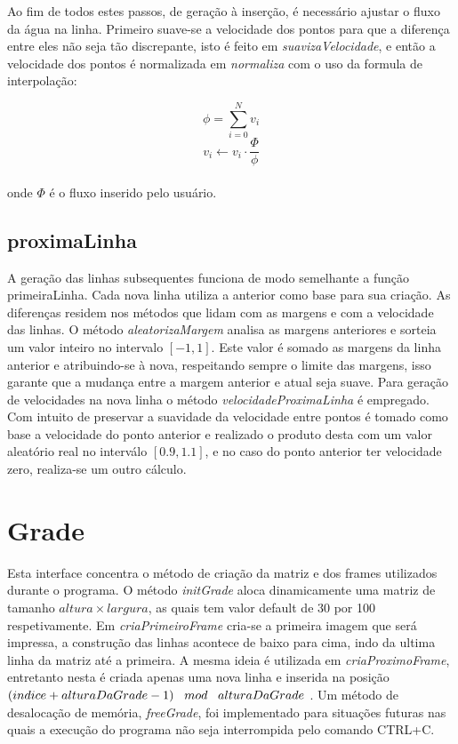 \documentclass[a4paper,11pt]{article}
\begin{document}
Ao fim de todos estes passos, de gera\c{c}ão à inser\c{c}ão, é necessário ajustar o fluxo da água na linha. Primeiro suave-se a velocidade dos pontos	 para que a diferen\c{c}a entre eles não seja tão discrepante, isto é feito em \textit{suavizaVelocidade}, e então a velocidade dos pontos é normalizada em \textit{normaliza} com o uso da formula de interpola\c{c}ão: 

\begin{equation}
\phi = \sum_{i=0}^{N} v_i
\end{equation}
\begin{equation}
v_i \leftarrow v_i\cdot\dfrac{\Phi}{\phi}
\end{equation}
\\
onde $\Phi$ é o fluxo inserido pelo usuário.

\subsection{proximaLinha}

A gera\c{c}ão das linhas subsequentes funciona de modo semelhante a fun\c{c}ão primeiraLinha. Cada nova linha utiliza a anterior como base para sua cria\c{c}ão. As diferen\c{c}as residem nos métodos que lidam com as margens e com a velocidade das linhas. O método \textit{aleatorizaMargem} analisa as margens anteriores e sorteia um valor inteiro no intervalo $[-1,1]$. Este valor é somado as margens da linha anterior e atribuindo-se à nova, respeitando sempre o limite das margens, isso garante que a mudan\c{c}a entre a margem anterior e atual seja suave. Para gera\c{c}ão de velocidades na nova linha o método \textit{velocidadeProximaLinha} é empregado. Com intuito de preservar a suavidade da velocidade entre pontos é tomado como base a velocidade do ponto anterior e realizado o produto desta com um valor aleatório real no interválo $[0.9,1.1]$, e no caso do ponto anterior ter velocidade zero, realiza-se um outro cálculo.

\section{Grade}
Esta interface concentra o método de cria\c{c}ão da matriz e dos frames utilizados durante o programa. O método \textit{initGrade} aloca dinamicamente uma matriz de tamanho $altura \times largura$, as quais tem valor default de 30 por 100 respetivamente. Em \textit{criaPrimeiroFrame} cria-se a primeira imagem que será impressa, a constru\c{c}ão das linhas acontece de baixo para cima, indo da ultima linha da matriz até a primeira. A mesma ideia é utilizada em \textit{criaProximoFrame}, entretanto nesta é criada apenas uma nova linha e inserida na posi\c{c}ão $(indice + alturaDaGrade -1)\text{ \, } mod \text{ \, } alturaDaGrade$ . Um método de desaloca\c{c}ão de memória, \textit{freeGrade}, foi implementado para situa\c{c}ões futuras nas quais a execu\c{c}ão do programa não seja interrompida pelo comando CTRL+C.
\end{document}
